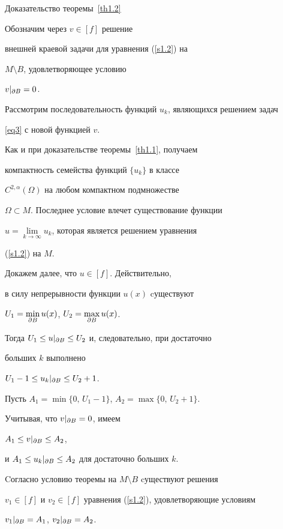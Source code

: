 \begin{pf*}{Доказательство теоремы~\ref{th1.2}}


Обозначим через $v\in [f]$ решение


внешней краевой задачи  для уравнения (\ref{s1.2}) на


$M\setminus B$, удовлетворяющее условию


$v|_{\partial{B}}=0$.


 


Рассмотрим последовательность функций $u_k$, являющихся решением задач


\eqref{eq3} с новой функцией $v$.





Как и при доказательстве теоремы~\ref{th1.1}, получаем


компактность семейства функций $\{u_k\}$ в классе 


$C^{2,\alpha}(\Omega)$ на любом компактном подмножестве


$\Omega\subset M$. Последнее условие влечет существование функции 


$u=\lim\limits_{k\to\infty}u_k$, которая является решением уравнения


(\ref{s1.2}) на $M$.





Докажем далее, что $u\in [f]$. Действительно, 


в силу непрерывности функции $u(x)$ cуществуют


$U_1=\min\limits_{\partial{B}}u(x)$, $U_2=\max\limits_{\partial{B}}u(x)$.


Тогда $U_1\leq u|_{\partial{B}}\leq U_2$ и, следовательно, при достаточно


больших $k$ выполнено


$U_1-1\leq u_k|_{\partial{B}}\leq U_2+1$.


Пусть $A_1=\min\{0,\,U_1-1\}$, $A_2=\max\{0,\,U_2+1\}$.


Учитывая, что $v|_{\partial{B}}=0$, имеем


$A_1\leq v|_{\partial{B}}\leq A_2$,


и  $A_1\leq u_k|_{\partial{B}}\leq A_2$ для достаточно больших $k$.


Cогласно условию теоремы на $M\setminus B$ cуществуют решения


$v_1\in[f]$ и $v_2\in[f]$ уравнения (\ref{s1.2}), удовлетворяющие условиям


$v_1|_{\partial{B}}=A_1$, $v_2|_{\partial{B}}=A_2$.



\end{pf*}
